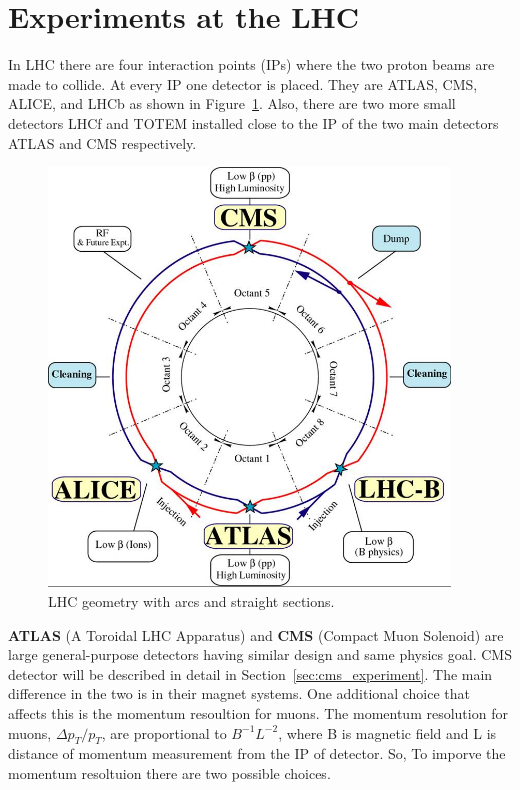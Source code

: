 
\section{Experiments at the LHC} %
\label{sec:experiments_at_the_lhc}

In LHC there are four interaction points (IPs) where the two proton beams are made to collide. At every IP one detector is placed. They are ATLAS, CMS, ALICE, and LHCb as shown in Figure~\ref{fig:LHCgeometry}. Also, there are two more small detectors LHCf and TOTEM installed close to the IP of the two main detectors ATLAS and CMS respectively.
\begin{figure}[!htbp]
	\centering
	\includegraphics[width=0.95\textwidth]{figures/LHC/lhc-schematic.jpg}
	\caption{LHC geometry with arcs and straight sections.}
	\label{fig:LHCgeometry}
\end{figure}
\newline
{\bf ATLAS} (A Toroidal LHC Apparatus) and {\bf CMS} (Compact Muon Solenoid) are large general-purpose detectors having similar design and same physics goal. CMS detector will be described in detail in Section~\ref{sec:cms_experiment}. The main difference in the two is in their magnet systems. One additional choice that affects this is the momentum resoultion for muons. The momentum resolution for muons, $\Delta p_T/p_T$, are proportional to  $B^{-1}L^{-2}$, where B is magnetic field and L is distance of momentum measurement from the IP of detector. So, To imporve the momentum resoltuion there are two possible choices.

